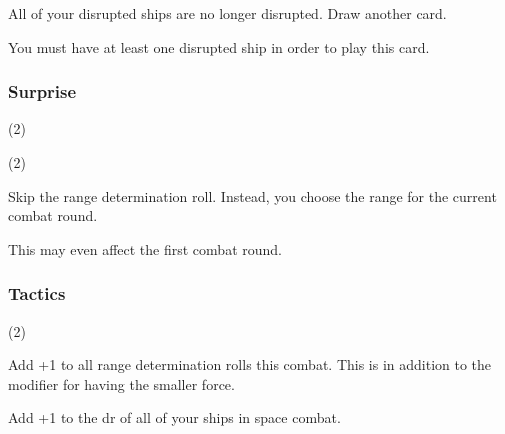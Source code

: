 \documentclass[a4paper,11pt,twocolumn]{article}
\begin{document}
All of your disrupted ships are no longer disrupted. Draw another card.

You must have at least one disrupted ship in order to play this card.

\subsubsection{Surprise} (2)

 (2)

Skip the range determination roll. Instead, you choose the range for the current combat round.

This may even affect the first combat round.

\subsubsection{Tactics} (2)

Add +1 to all range determination rolls this combat. This is in addition to the modifier for having the smaller force.

Add +1 to the dr of all of your ships in space combat.
\end{document}
